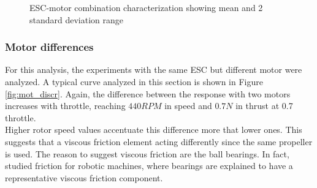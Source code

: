 \begin{figure}[!tbp]
  \centering
  \caption{ESC-motor combination characterization showing mean and 2 standard deviation range}
  \label{fig:esc_mot_stats}
\end{figure}

\subsubsection{Motor differences}
For this analysis, the experiments with the same ESC but different motor were analyzed. A typical curve analyzed in this section is shown in Figure \ref{fig:mot_discr}. Again, the difference between the response with two motors increases with throttle, reaching $440RPM$ in speed and $0.7N$ in thrust at 0.7 throttle. \\

Higher rotor speed values accentuate this difference more that lower ones. This suggests that a viscous friction element acting differently since the same propeller is used. The reason to suggest viscous friction are the ball bearings. In fact, \cite{Armstrong-H1994} studied friction for robotic machines, where bearings are explained to have a representative viscous friction component.\\


